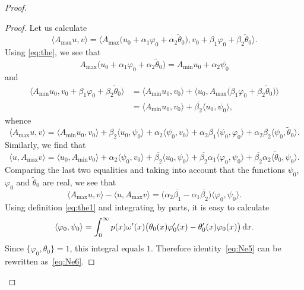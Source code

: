 \documentclass[10pt,a4paper]{amsart}
\numberwithin{equation}{section}
\begin{document}
\begin{proof}
 \begin{proof}
 Let us calculate
 \[
\langle A_{\max} u,v\rangle = \big\langle A_{\max} \big(u_{0}+ \alpha_{1} \varphi_{0}+ \alpha_{2} \tilde{\theta}_{0 }\big),v_{0}+ \beta_{1} \varphi_0+ \beta_{2} \tilde{\theta}_{0 }\big\rangle.
 \]
 Using \eqref{eq:the}, we see that
 \[
 A_{\max} \big(u_{0}+ \alpha_{1} \varphi_{0}+ \alpha_{2} \tilde{\theta}_{0 }\big)= A_{\min} u_{0} + \alpha_{2}\psi_{0}
 \]
 and
 \begin{align*}
\big \langle A_{\min} u_{0} ,v_{0}+ \beta_{1} \varphi_0+ \beta_{2} \tilde{\theta}_{0 }\big\rangle
 & =
 \langle A_{\min} u_{0} ,v_{0}\rangle + \big\langle u_{0} , A_{\max} \big(\beta_{1} \varphi_0+ \beta_{2} \tilde{\theta}_{0 }\big)\big\rangle
\nonumber \\
 & = \langle A_{\min} u_{0} ,v_{0}\rangle + \overline{\beta_{2}} \langle u_{0} , \psi_{0}\rangle,
 \end{align*}
 whence
 \[
\langle A_{\max} u,v\rangle = \langle A_{\min} u_{0} ,v_{0}\rangle + \overline{\beta_{2}} \langle u_{0} , \psi_{0}\rangle
+ \alpha_{2} \langle \psi_{0},v_{0}\rangle
+ \alpha_{2}\overline{\beta_{1}} \langle \psi_{0} , \varphi_{0}\rangle
+ \alpha_{2}\overline{\beta_{2}} \big\langle \psi_{0} , \tilde{\theta}_{0}\big\rangle .
 \]
 Similarly, we find that
 \[
\langle u, A_{\max} v\rangle = \langle u_{0} , A_{\min}v_{0}\rangle + \alpha_{2} \langle \psi_{0}, v_{0}\rangle
+ \overline{\beta_{2}}\langle u_{0}, \psi_{0}\rangle
+ \overline{\beta_{2}}\alpha_{1}\langle \varphi_{0}, \psi_{0}\rangle
+ \overline{\beta_{2}}\alpha_{2} \big\langle \tilde{\theta}_{0}, \psi_{0}\big\rangle .
 \]
 Comparing the last two equalities and taking into account that the functions $\psi_{0}$, $\varphi_{0}$ and $\tilde{\theta}_{0}$ are real, we see that
 \begin{equation}
\langle A_{\max} u,v\rangle - \langle u, A_{\max} v \rangle= \big(\alpha_{2} \overline{\beta_{1}} - \alpha_{1} \overline{\beta_{2}} \big)\langle \varphi_{0}, \psi_{0}\rangle.
 \label{eq:Ne5}\end{equation}
 Using definition \eqref{eq:the1} and integrating by parts, it is easy to calculate
 \[
 \langle \varphi_{0}, \psi_{0}\rangle=\int_{0}^\infty p(x) \omega'(x) \big(\theta_{0} (x)\varphi_{0}' (x) - \theta'_{0} (x)\varphi_{0} (x)
 \big) \,{\rm d}x.
 \]
 Since $\{ \varphi_{0}, \theta_{0}\}=1$, this integral equals $1$. Therefore identity~\eqref{eq:Ne5} can be rewritten as~\eqref{eq:Ne6}.
 \end{proof}


\end{proof}
\end{document}
